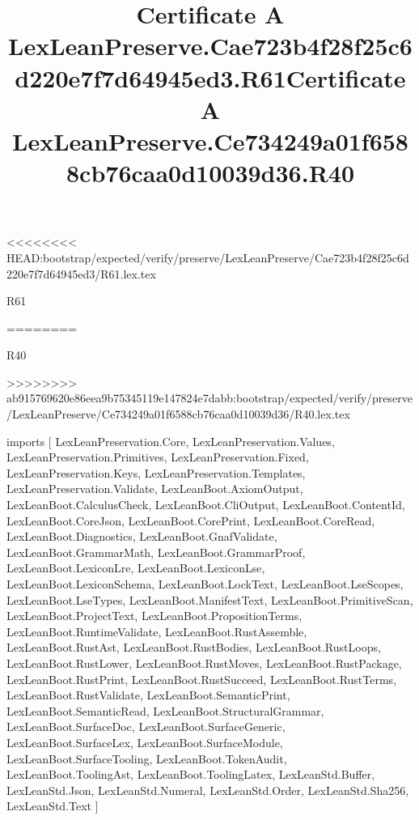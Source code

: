 <<<<<<<< HEAD:bootstrap/expected/verify/preserve/LexLeanPreserve/Cae723b4f28f25c6d220e7f7d64945ed3/R61.lex.tex
\begin{lexlean}{R61}
\title{Certificate A LexLeanPreserve.Cae723b4f28f25c6d220e7f7d64945ed3.R61}
========
\begin{lexlean}{R40}
\title{Certificate A LexLeanPreserve.Ce734249a01f6588cb76caa0d10039d36.R40}
>>>>>>>> ab915769620e86eea9b75345119e147824e7dabb:bootstrap/expected/verify/preserve/LexLeanPreserve/Ce734249a01f6588cb76caa0d10039d36/R40.lex.tex
\begin{coremodule}
imports [
  LexLeanPreservation.Core,
  LexLeanPreservation.Values,
  LexLeanPreservation.Primitives,
  LexLeanPreservation.Fixed,
  LexLeanPreservation.Keys,
  LexLeanPreservation.Templates,
  LexLeanPreservation.Validate,
  LexLeanBoot.AxiomOutput,
  LexLeanBoot.CalculusCheck,
  LexLeanBoot.CliOutput,
  LexLeanBoot.ContentId,
  LexLeanBoot.CoreJson,
  LexLeanBoot.CorePrint,
  LexLeanBoot.CoreRead,
  LexLeanBoot.Diagnostics,
  LexLeanBoot.GnafValidate,
  LexLeanBoot.GrammarMath,
  LexLeanBoot.GrammarProof,
  LexLeanBoot.LexiconLre,
  LexLeanBoot.LexiconLse,
  LexLeanBoot.LexiconSchema,
  LexLeanBoot.LockText,
  LexLeanBoot.LseScopes,
  LexLeanBoot.LseTypes,
  LexLeanBoot.ManifestText,
  LexLeanBoot.PrimitiveScan,
  LexLeanBoot.ProjectText,
  LexLeanBoot.PropositionTerms,
  LexLeanBoot.RuntimeValidate,
  LexLeanBoot.RustAssemble,
  LexLeanBoot.RustAst,
  LexLeanBoot.RustBodies,
  LexLeanBoot.RustLoops,
  LexLeanBoot.RustLower,
  LexLeanBoot.RustMoves,
  LexLeanBoot.RustPackage,
  LexLeanBoot.RustPrint,
  LexLeanBoot.RustSucceed,
  LexLeanBoot.RustTerms,
  LexLeanBoot.RustValidate,
  LexLeanBoot.SemanticPrint,
  LexLeanBoot.SemanticRead,
  LexLeanBoot.StructuralGrammar,
  LexLeanBoot.SurfaceDoc,
  LexLeanBoot.SurfaceGeneric,
  LexLeanBoot.SurfaceLex,
  LexLeanBoot.SurfaceModule,
  LexLeanBoot.SurfaceTooling,
  LexLeanBoot.TokenAudit,
  LexLeanBoot.ToolingAst,
  LexLeanBoot.ToolingLatex,
  LexLeanStd.Buffer,
  LexLeanStd.Json,
  LexLeanStd.Numeral,
  LexLeanStd.Order,
  LexLeanStd.Sha256,
  LexLeanStd.Text
]


\end{coremodule}
\end{lexlean}
\end{lexlean}
